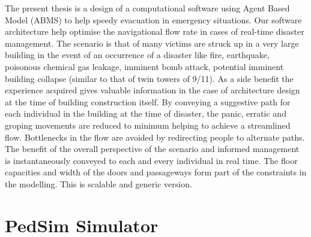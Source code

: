 The present thesis is a design of a computational software using Agent Based Model (ABMS) to help speedy evacuation in emergency situations. Our software architecture help optimise the navigational flow rate in cases of real-time disaster management. The scenario is that of many victims are struck up in a very large building in the event of an occurrence of a disaster like fire, earthquake, poisonous chemical gas leakage, imminent bomb attack, potential imminent building collapse (similar to that of twin towers of 9/11). As a side benefit the experience acquired gives valuable information in the case of architecture design at the time of building construction itself. By conveying a suggestive path for each individual in the building at the time of disaster, the panic, erratic and groping movements are reduced to minimum helping to achieve a streamlined flow. Bottlenecks in the flow are avoided by redirecting people to alternate paths. The benefit of the overall perspective of the scenario and informed management is instantaneously conveyed to each and every individual in real time. The floor capacities and width of the doors and passageways form part of the constraints in the modelling. This is scalable and generic version.

\section{PedSim Simulator}
\label{sec:intro:PedSim Simulator}

